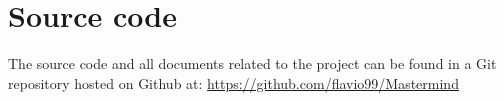 \documentclass[a4paper, 12pt]{article}
\begin{document}
% 
% 
% 
% 
% 
% 

\section*{Source code}
The source code and all documents related to the project can be found in
a Git repository hosted on Github at:
\url{https://github.com/flavio99/Mastermind}
\end{document}
